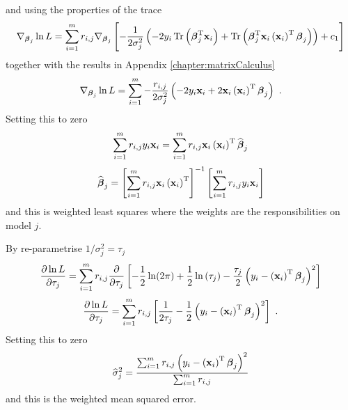 \documentclass[12pt]{report}
\DeclareMathOperator{\trace}{Tr}
\newcommand{\T}{^\textup{T}}
\newcommand{\vect}[1]{\mathbf{#1}}
\newcommand{\vectGreek}[1]{\boldsymbol{#1}}
\begin{document}
and using the properties of the trace
\begin{equation*}
\nabla_{\vectGreek{\beta}_j}\ln{L}
=\sum_{i=1}^{m}
r_{i,j}
\nabla_{\vectGreek{\beta}_j}
\left[-\frac{1}{2\sigma_j^2}\left(-2y_i\trace\left(\vectGreek{\beta}_j\T\vect{x}_i\right)
+\trace\left(\vectGreek{\beta}_j\T\vect{x}_i\left(\vect{x}_i\right)\T\vectGreek{\beta}_j
\right)\right)
+c_1
\right]
\end{equation*}
together with the results in Appendix \ref{chapter:matrixCalculus}
\begin{equation}
\nabla_{\vectGreek{\beta}_j}\ln{L}
=\sum_{i=1}^{m}
-\frac{r_{i,j}}{2\sigma_j^2}
\left(-2y_i\vect{x}_i
+2\vect{x}_i\left(\vect{x}_i\right)\T\vectGreek{\beta}_j
\right) \ .
\end{equation}
Setting this to zero
\begin{equation*}
\sum_{i=1}^{m}
r_{i,j}
y_i\vect{x}_i
=
\sum_{i=1}^{m}r_{i,j}
\vect{x}_i\left(\vect{x}_i\right)\T\widehat{\vectGreek{\beta}}_j
\end{equation*}
\begin{equation}
\widehat{\vectGreek{\beta}}_j
=
\left[\sum_{i=1}^{m}r_{i,j}
\vect{x}_i\left(\vect{x}_i\right)\T\right]^{-1}
\left[\sum_{i=1}^{m}
r_{i,j}
y_i\vect{x}_i\right]
\end{equation}
and this is weighted least squares where the weights are the responsibilities on model $j$.

By re-parametrise $1/\sigma_j^2=\tau_j$
\begin{equation*}
\frac{\partial\ln{L}}{\partial\tau_j}
=\sum_{i=1}^{m}
r_{i,j}
\frac{\partial}{\partial\tau_j}
\left[
	-\frac{1}{2}\ln(2\pi) + \frac{1}{2}\ln\left(\tau_j\right)-\frac{\tau_j}{2}\left({y_i-\left(\vect{x}_i\right)\T\vectGreek{\beta}_j}\right)^2
\right]
\end{equation*}
\begin{equation}
\frac{\partial\ln{L}}{\partial\tau_j}
=\sum_{i=1}^{m}
r_{i,j}
\left[\frac{1}{2\tau_j}-\frac{1}{2}\left({y_i-\left(\vect{x}_i\right)\T\vectGreek{\beta}_j}\right)^2
\right] \ .
\end{equation}
Setting this to zero
\begin{equation}
\widehat{\sigma}_j^2
=
\frac{\sum_{i=1}^{m}
r_{i,j}\left({y_i-\left(\vect{x}_i\right)\T\vectGreek{\beta}_j}\right)^2}
{\sum_{i=1}^{m}r_{i,j}}
\end{equation}
and this is the weighted mean squared error.
\end{document}
